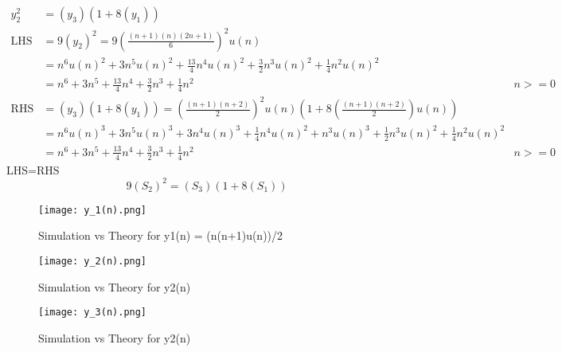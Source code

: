 \documentclass[journal,12pt,onecolumn]{IEEEtran}
\theoremstyle{remark}
\begin{document}
\begin{align}
y_2^2 &= (y_3)(1 + 8(y_1)) \\
\text{LHS} &= 9(y_2)^2 = 9\left(\frac{(n+1)(n)(2n+1)}{6}\right)^2u(n)\\
&=n^6 u(n)^2 + 3n^5 u(n)^2 + \frac{13}{4}n^4 u(n)^2 + \frac{3}{2}n^3 u(n)^2 + \frac{1}{4}n^2 u(n)^2\\
&= n^6 + 3n^5 + \frac{13}{4}n^4 + \frac{3}{2}n^3 + \frac{1}{4}n^2 &n>=0\\
\text{RHS} &= (y_3)(1 + 8(y_1)) = \left(\frac{(n+1)(n+2)}{2}\right)^2u(n)(1+8\left(\frac{(n+1)(n+2)}{2}\right)u(n)) \\
&=n^6 u(n)^3 + 3n^5 u(n)^3 + 3n^4 u(n)^3 + \frac{1}{4}n^4 u(n)^2 + n^3 u(n)^3 + \frac{1}{2}n^3 u(n)^2 + \frac{1}{4}n^2 u(n)^2\\
&= n^6 + 3n^5 + \frac{13}{4}n^4 + \frac{3}{2}n^3 + \frac{1}{4}n^2 &n>=0
\end{align}
LHS=RHS
\[ 9(S_2)^2 = (S_3)(1 + 8(S_1)) \]

\begin{figure}[htbp]
    \centering
    \texttt{[image: y\_1(n).png]}
    \caption{Simulation vs Theory for y1(n) = (n(n+1)u(n))/2}
    \label{fig:figure1}
\end{figure}  

\begin{figure}[htbp]
    \centering
    \texttt{[image: y\_2(n).png]}
    \caption{Simulation vs Theory for y2(n)}
    \label{fig:figure2}
\end{figure}   

\begin{figure}[htbp]
    \centering
    \texttt{[image: y\_3(n).png]}
    \caption{Simulation vs Theory for y2(n) }
    \label{fig:figure3}
\end{figure} 
\end{document}
